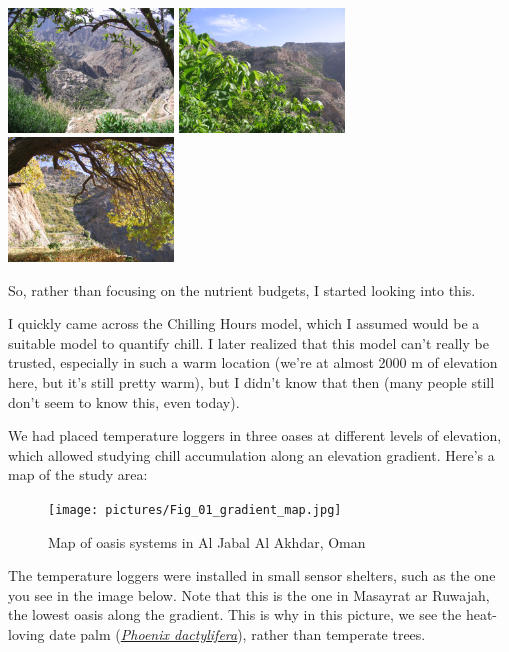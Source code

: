 \documentclass[
]{book}
\begin{document}
\includegraphics[width=0.33\textwidth,height=\textheight]{pictures/IMG_7190.JPG} \includegraphics[width=0.33\textwidth,height=\textheight]{pictures/IMG_7332.JPG} \includegraphics[width=0.33\textwidth,height=\textheight]{pictures/IMG_5690.JPG}

So, rather than focusing on the nutrient budgets, I started looking into this.

I quickly came across the Chilling Hours model, which I assumed would be a suitable model to quantify chill. I later realized that this model can't really be trusted, especially in such a warm location (we're at almost 2000 m of elevation here, but it's still pretty warm), but I didn't know that then (many people still don't seem to know this, even today).

We had placed temperature loggers in three oases at different levels of elevation, which allowed studying chill accumulation along an elevation gradient. Here's a map of the study area:

\begin{figure}
\centering
\texttt{[image: pictures/Fig\_01\_gradient\_map.jpg]}
\caption{Map of oasis systems in Al Jabal Al Akhdar, Oman}
\end{figure}

The temperature loggers were installed in small sensor shelters, such as the one you see in the image below. Note that this is the one in Masayrat ar Ruwajah, the lowest oasis along the gradient. This is why in this picture, we see the heat-loving date palm (\href{https://en.wikipedia.org/wiki/Date_palm}{\emph{Phoenix dactylifera}}), rather than temperate trees.
\end{document}
